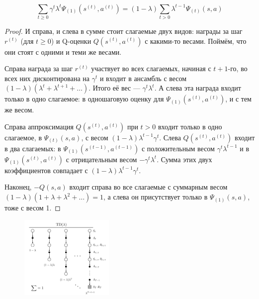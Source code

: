 \begin{theoremBox}[label=th:tdlambda]{}\,
\begin{equation}\label{TDlambda}
\sum_{t \ge 0} \gamma^t \lambda^t \Psi_{(1)}(s^{(t)}, a^{(t)}) = (1 - \lambda) \sum_{t > 0} \lambda^{t-1} \Psi_{(t)}(s, a)
\end{equation}
\begin{proof} И справа, и слева в сумме стоит слагаемые двух видов: награды за шаг $r^{(t)}$ (для $t \ge 0$) и Q-оценки $Q(s^{(t)}, a^{(t)})$ с какими-то весами. Поймём, что они стоят с одними и теми же весами.

Справа награда за шаг $r^{(t)}$ участвует во всех слагаемых, начиная с $t + 1$-го, во всех них дисконтирована на $\gamma^t$ и входит в ансамбль с весом $(1 - \lambda)(\lambda^t + \lambda^{t+1} + \dots)$. Итого её вес --- $\gamma^t\lambda^t$. А слева эта награда входит только в одно слагаемое: в одношаговую оценку для $\Psi_{(1)}(s^{(t)}, a^{(t)})$, и с тем же весом.

Справа аппроксимация $Q(s^{(t)}, a^{(t)})$ при $t > 0$ входит только в одно слагаемое, в $\Psi_{(t)}(s, a)$, с весом $(1 - \lambda)\lambda^{t - 1}\gamma^t$. Слева $Q(s^{(t)}, a^{(t)})$ входит в два слагаемых: в $\Psi_{(1)}(s^{(t-1)}, a^{(t-1)})$ с положительным весом $\gamma^t\lambda^{t-1}$ и в $\Psi_{(1)}(s^{(t)}, a^{(t)})$ с отрицательным весом $-\gamma^t\lambda^t$. Сумма этих двух коэффициентов совпадает с $(1 - \lambda)\lambda^{t - 1}\gamma^t$.

Наконец, $-Q(s, a)$ входит справа во все слагаемые с суммарным весом $(1 - \lambda)(1 + \lambda + \lambda^2 + \dots) = 1$, а слева он присутствует только в $\Psi_{(1)}(s, a)$, тоже с весом 1.
\end{proof}
\end{theoremBox}

\begin{figure}
\vspace{-0.4cm}
\centering
\includegraphics[width=0.4\textwidth]{Images/td_lambda.png}
\vspace{-0.7cm}
\end{figure}

